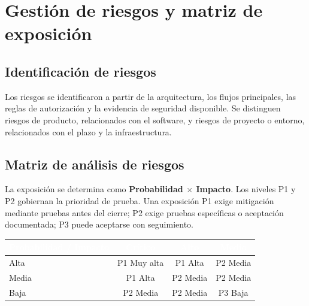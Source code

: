 \documentclass[11pt,a4paper]{article}
\newcommand{\thead}[1]{\textcolor{white}{\textbf{#1}}}
\begin{document}
\section{Gestión de riesgos y matriz de exposición}

\subsection{Identificación de riesgos}
Los riesgos se identificaron a partir de la arquitectura, los flujos principales, las reglas de autorización y la evidencia de seguridad disponible. Se distinguen riesgos de producto, relacionados con el software, y riesgos de proyecto o entorno, relacionados con el plazo y la infraestructura.

\subsection{Matriz de análisis de riesgos}
La exposición se determina como \textbf{Probabilidad $\times$ Impacto}. Los niveles P1 y P2 gobiernan la prioridad de prueba. Una exposición P1 exige mitigación mediante pruebas antes del cierre; P2 exige pruebas específicas o aceptación documentada; P3 puede aceptarse con seguimiento.

\begin{center}
\begin{tabular}{lccc}
\rowcolor{uniwayblue}\thead{Probabilidad / Impacto} & \thead{Crítico} & \thead{Alto} & \thead{Medio}\\
\midrule
Alta & P1 Muy alta & P1 Alta & P2 Media\\
\rowcolor{lightgray}Media & P1 Alta & P2 Media & P2 Media\\
Baja & P2 Media & P2 Media & P3 Baja\\
\end{tabular}
\end{center}
\end{document}
